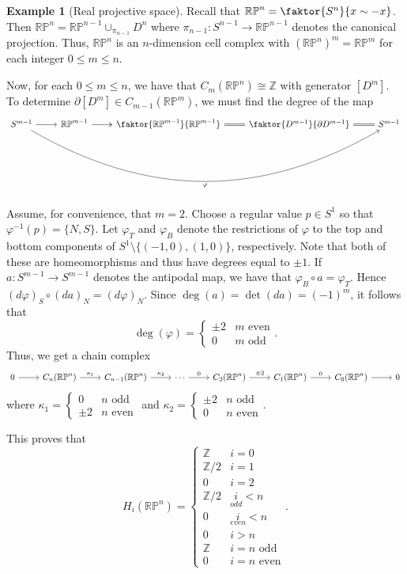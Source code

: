 \documentclass[10pt,letterpaper,cm]{nupset}
\theoremstyle{definition}
\newtheorem{exmp}[defn]{Example}
\theoremstyle{theorem}
\theoremstyle{remark}
\newcommand{\RP}{\mathbb{RP}}
\newcommand{\Z}{\mathbb Z}
\newcommand{\1}{\mathbb{1}}
\newcommand{\0}{\vec 0}
\begin{document}
\begin{exmp}[Real projective space]
Recall that $\RP^n = \faktor{S^n}{x \sim {-}x}$. Then $\RP^n = \RP^{n-1} \cup_{\pi_{n-1}} D^n$ where $\pi_{n-1} : S^{n-1} \to \RP^{n-1}$ denotes the canonical projection. Thus, $\RP^n$ is an $n$-dimension cell complex with $(\RP^n)^m = \RP^m$ for each integer $0\leq m\leq n$.

\medskip

Now, for each $0\leq m \leq n$, we have that $C_m(\RP^n) \cong \Z$ with generator $[D^m]$. To determine $\partial[D^m]\in C_{m-1}(\RP^m)$, we must find the degree of the map
\[
\begin{tikzcd}
S^{m-1} \arrow[rrrr, "\varphi"', bend right] \arrow[r] & \RP^{m-1} \arrow[r, two heads] & \faktor{\RP^{m-1}}{\RP^{m-1}} \arrow[r, equals] & \faktor{D^{m-1}}{\partial{D^{m-1}}} \arrow[r, equals] & S^{m-1}
\end{tikzcd}
\]
Assume, for convenience, that $m=2$. Choose a regular value $p\in S^{1}$ so that $\varphi^{-1}(p) = \{N, S\}$. Let $\varphi_T$ and $\varphi_B$ denote the restrictions of $\varphi$ to the top and bottom components of $S^1 \setminus \{({-}1, 0), (1,0)\}$, respectively. Note that both of these are homeomorphisms and thus have degrees equal to $\pm 1$. If $a: S^{m-1} \to S^{m-1}$ denotes the antipodal map, we have that $\varphi_B \circ a= \varphi_T$. Hence $(d{\varphi})_S \circ (d{a})_N = (d{\varphi})_N$.  Since $\deg(a) = \det(d{a}) = ({-}1)^m$, it follows that $$\deg(\varphi) = \begin{cases} \pm 2 & m  \text{ even} \\ 0 & m \text{ odd} \end{cases}.$$
Thus, we get a chain complex
\[
\begin{tikzcd}
0 \arrow[r] & C_n(\RP^n) \arrow[r, "\kappa_1"] & C_{n-1}(\RP^n) \arrow[r, "\kappa_2"] & \cdots \arrow[r, "0"] & C_2(\RP^n) \arrow[r, "\pm 2"] & C_1(\RP^n) \arrow[r, "0"] & C_0(\RP^n) \arrow[r] & 0
\end{tikzcd}
\] where $\kappa_1 = \begin{cases} 0 & n \text{ odd} \\ \pm 2 & n \text{ even} \end{cases}$ and $\kappa_2 = \begin{cases} \pm 2 & n \text{ odd} \\ 0 & n \text{ even} \end{cases}$.

This proves that $$ H_i( \RP^n) = \begin{cases} \Z & i =0 \\ \Z/2 & i =1 \\ 0 & i =2 \\ \Z/2 & \underset{odd}{i} <n \\ 0 & \underset{even}{i} <n \\ 0 & i >n \\ \Z & i =n \text{ odd} \\ 0 & i= n \text{ even}    \end{cases}  .$$
\end{exmp}
\end{document}
